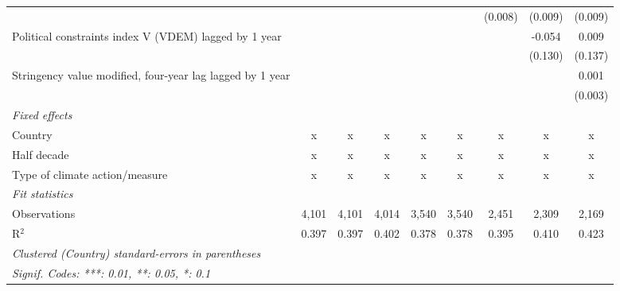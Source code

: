 \begin{tabular}{lcccccccc}
                                                             &              &              &              &               &               & (0.008)      & (0.009)      & (0.009)\\   
   Political constraints index V (VDEM) lagged by 1 year     &              &              &              &               &               &              & -0.054       & 0.009\\   
                                                             &              &              &              &               &               &              & (0.130)      & (0.137)\\   
   Stringency value modified, four-year lag lagged by 1 year &              &              &              &               &               &              &              & 0.001\\   
                                                             &              &              &              &               &               &              &              & (0.003)\\   
   \emph{Fixed effects}\\
   Country                                                   & x            & x            & x            & x             & x             & x            & x            & x\\  
   Half decade                                               & x            & x            & x            & x             & x             & x            & x            & x\\  
   Type of climate action/measure                            & x            & x            & x            & x             & x             & x            & x            & x\\  
   \midrule \emph{Fit statistics}\\
   Observations                                              & 4,101        & 4,101        & 4,014        & 3,540         & 3,540         & 2,451        & 2,309        & 2,169\\  
   R$^2$                                                     & 0.397        & 0.397        & 0.402        & 0.378         & 0.378         & 0.395        & 0.410        & 0.423\\  
   \midrule
   \multicolumn{9}{l}{\emph{Clustered (Country) standard-errors in parentheses}}\\
   \multicolumn{9}{l}{\emph{Signif. Codes: ***: 0.01, **: 0.05, *: 0.1}}\\
\end{tabular}
\par\endgroup


